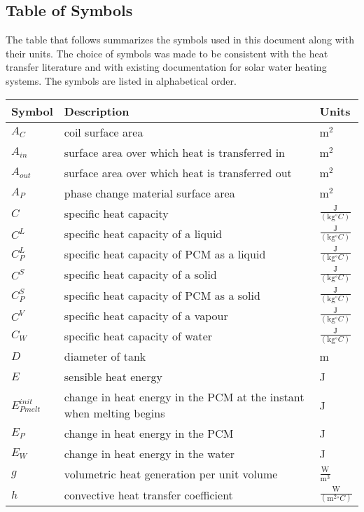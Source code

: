 \documentclass[12pt]{article}
\begin{document}
\subsection{Table of Symbols}
\label{Sec:ToS}
The table that follows summarizes the symbols used in this document along with their units. The choice of symbols was made to be consistent with the heat transfer literature and with existing documentation for solar water heating systems. The symbols are listed in alphabetical order.
\begin{longtable*}{l l l}
\toprule
Symbol & Description & Units
\\
\midrule
$A_{C}$ & coil surface area & $\text{m}^{2}$
\\
$A_{in}$ & surface area over which heat is transferred in & $\text{m}^{2}$
\\
$A_{out}$ & surface area over which heat is transferred out & $\text{m}^{2}$
\\
$A_{P}$ & phase change material surface area & $\text{m}^{2}$
\\
$C$ & specific heat capacity & $\frac{\text{J}}{(\text{kg}{}^{\circ}C)}$
\\
$C^{L}$ & specific heat capacity of a liquid & $\frac{\text{J}}{(\text{kg}{}^{\circ}C)}$
\\
$C_{P}^{L}$ & specific heat capacity of PCM as a liquid & $\frac{\text{J}}{(\text{kg}{}^{\circ}C)}$
\\
$C^{S}$ & specific heat capacity of a solid & $\frac{\text{J}}{(\text{kg}{}^{\circ}C)}$
\\
$C_{P}^{S}$ & specific heat capacity of PCM as a solid & $\frac{\text{J}}{(\text{kg}{}^{\circ}C)}$
\\
$C^{V}$ & specific heat capacity of a vapour & $\frac{\text{J}}{(\text{kg}{}^{\circ}C)}$
\\
$C_{W}$ & specific heat capacity of water & $\frac{\text{J}}{(\text{kg}{}^{\circ}C)}$
\\
$D$ & diameter of tank & m
\\
$E$ & sensible heat energy & J
\\
$E_{Pmelt}^{init}$ & change in heat energy in the PCM at the instant when melting begins & J
\\
$E_{P}$ & change in heat energy in the PCM & J
\\
$E_{W}$ & change in heat energy in the water & J
\\
$g$ & volumetric heat generation per unit volume & $\frac{\text{W}}{\text{m}^{3}}$
\\
$h$ & convective heat transfer coefficient & $\frac{\text{W}}{(\text{m}^{2}{}^{\circ}C)}$

\end{longtable*}
\end{document}
